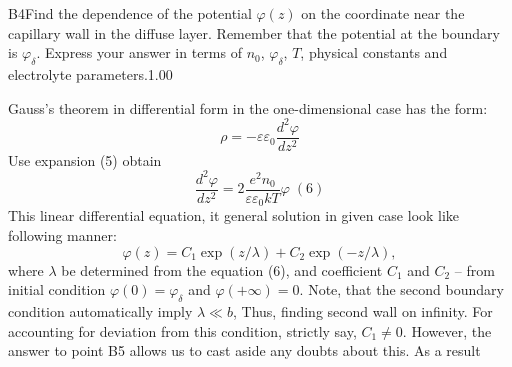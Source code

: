 \documentclass[11pt,a4paper]{article}
\begin{document}
\begin{solcard}{B4}{Find the dependence of the potential $\varphi(z)$ on the coordinate near the capillary wall in the diffuse layer. Remember that the potential at the boundary is $\varphi_\delta$. Express your answer in terms of $n_0$, $\varphi_\delta$, $T$, physical constants and electrolyte parameters.}{1.00}

Gauss's theorem in differential form in the one-dimensional case has the form: $$ \rho = - \varepsilon \varepsilon_0 \frac{d^2 \varphi}{dz^2} $$ Use expansion (5) obtain $$ \frac{d^2 \varphi}{ dz^2} = 2 \frac{e^2 n_0}{\varepsilon \varepsilon_0 kT} \varphi \;(\text{6}) $$ This linear differential equation, it general solution in given case look like following manner: $$ \varphi(z) = C_1 \exp \left( z/\lambda \right) + C_2 \exp \left( - z/\lambda \right), $$ where $\lambda$ be determined from the equation (6), and coefficient $C_1$ and $C_2$ – from initial condition $\varphi(0) = \varphi_\delta$ and $\varphi(+\infty) = 0$. Note, that the second boundary condition automatically imply $\lambda \ll b$, Thus, finding second wall on infinity. For accounting for deviation from this condition, strictly say, $C_1 \neq 0$. However, the answer to point B5 allows us to cast aside any doubts about this. As a result



\end{solcard}
\end{document}
